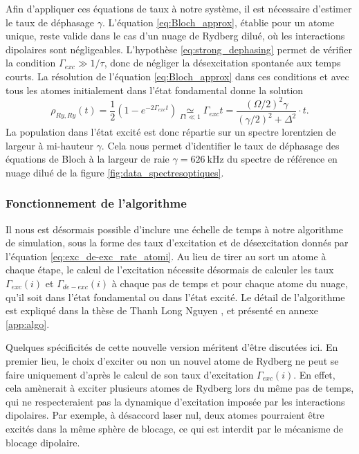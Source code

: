 Afin d'appliquer ces équations de taux à notre système, il est nécessaire d'estimer le taux de déphasage $\gamma$.
L'équation \eqref{eq:Bloch_approx}, établie pour un atome unique, reste valide dans le cas d'un nuage de Rydberg dilué, où les interactions dipolaires sont négligeables.
L'hypothèse \eqref{eq:strong_dephasing} permet de vérifier la condition $\Gamma_{exc} \gg 1/\tau$, donc de négliger la désexcitation spontanée aux temps courts.
La résolution de l'équation \eqref{eq:Bloch_approx} dans ces conditions et avec tous les atomes initialement dans l'état fondamental donne la solution 
\begin{equation}
\label{eq:Lorenztian_rhorr}
\rho_{Ry,Ry} (t) = \frac{1}{2}\left( 1-e^{-2\Gamma_{exc}t} \right)
\underset{\Gamma t \ll 1}{\simeq} \Gamma_{exc} t = \frac{(\Omega/2)^2 \gamma}{(\gamma/2)^2 + \Delta^2} \cdot t.
\end{equation}
La population dans l'état excité est donc répartie sur un spectre lorentzien de largeur à mi-hauteur $\gamma$.
Cela nous permet d'identifier le taux de déphasage des équations de Bloch à la largeur de raie $\gamma = \SI{626}{\kHz}$ du spectre de référence en nuage dilué de la figure \eqref{fig:data_spectresoptiques}.

	\subsubsection*{Fonctionnement de l'algorithme}
\noindent Il nous est désormais possible d'inclure une échelle de temps à notre algorithme de simulation, sous la forme des taux d'excitation et de désexcitation donnés par l'équation \eqref{eq:exc_de-exc_rate_atomi}.
Au lieu de tirer au sort un atome à chaque étape, le calcul de l'excitation nécessite désormais de calculer les taux $\Gamma_{exc}(i)$ et $\Gamma_{de-exc}(i)$ à chaque pas de temps et pour chaque atome du nuage, qu'il soit dans l'état fondamental ou dans l'état excité.
Le détail de l'algorithme est expliqué dans la thèse de Thanh Long Nguyen \cite{PHD_NGUYEN}, et présenté en annexe \ref{app:algo}.

Quelques spécificités de cette nouvelle version méritent d'être discutées ici.
En premier lieu, le choix d'exciter ou non un nouvel atome de Rydberg ne peut se faire uniquement d'après le calcul de son taux d'excitation $\Gamma_{exc}(i)$.
En effet, cela amènerait à exciter plusieurs atomes de Rydberg lors du même pas de temps, qui ne respecteraient pas la dynamique d'excitation imposée par les interactions dipolaires.
Par exemple, à désaccord laser nul, deux atomes pourraient être excités dans la même sphère de blocage, ce qui est interdit par le mécanisme de blocage dipolaire.

